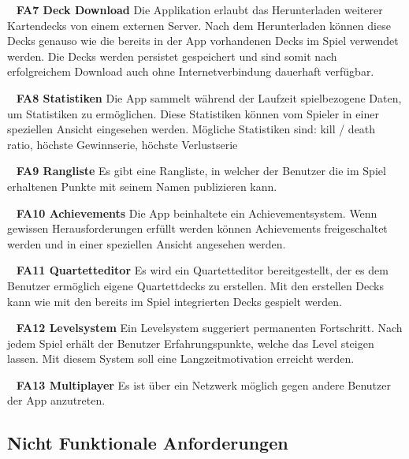 \documentclass{scrartcl}
\begin{document}
\ \newline
\textbf{FA7 Deck Download} \newline
Die Applikation erlaubt das Herunterladen weiterer Kartendecks von einem
externen Server. Nach dem Herunterladen können diese Decks genauso wie die
bereits in der App vorhandenen Decks im Spiel verwendet werden. Die Decks werden
persistet gespeichert und sind somit nach erfolgreichem Download auch ohne
Internetverbindung dauerhaft verfügbar.

\ \newline
\textbf{FA8 Statistiken} \newline
Die App sammelt während der Laufzeit spielbezogene Daten, um Statistiken zu
ermöglichen. Diese Statistiken können vom Spieler in einer speziellen Ansicht
eingesehen werden. Mögliche Statistiken sind: kill / death ratio, höchste
Gewinnserie, höchste Verlustserie

\ \newline
\textbf{FA9 Rangliste} \newline
Es gibt eine Rangliste, in welcher der Benutzer die im Spiel erhaltenen Punkte
mit seinem Namen publizieren kann.

\ \newline
\textbf{FA10 Achievements} \newline
Die App beinhaltete ein Achievementsystem. Wenn gewissen Herausforderungen
erfüllt werden können Achievements freigeschaltet werden und in einer speziellen
Ansicht angesehen werden.

\ \newline
\textbf{FA11 Quartetteditor} \newline
Es wird ein Quartetteditor bereitgestellt, der es dem Benutzer ermöglich
eigene Quartettdecks zu erstellen. Mit den erstellen Decks kann wie mit den
bereits im Spiel integrierten Decks gespielt werden.

\ \newline
\textbf{FA12 Levelsystem} \newline
Ein Levelsystem suggeriert permanenten Fortschritt. Nach jedem Spiel erhält der
Benutzer Erfahrungspunkte, welche das Level steigen lassen. Mit diesem System
soll eine Langzeitmotivation erreicht werden.

\ \newline
\textbf{FA13 Multiplayer} \newline
Es ist über ein Netzwerk möglich gegen andere Benutzer der App anzutreten.


\subsection{Nicht Funktionale Anforderungen}
\end{document}
